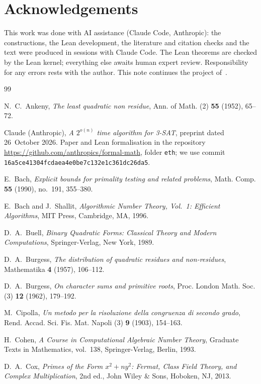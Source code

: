 \documentclass[10pt]{amsart}
\theoremstyle{plain}
\theoremstyle{definition}
\theoremstyle{remark}
\numberwithin{equation}{section}
\begin{document}
\section*{Acknowledgements}
This work was done with AI assistance (Claude Code, Anthropic): the constructions, the Lean development,
the literature and citation checks and the text were produced in sessions with Claude Code. The Lean
theorems are checked by the Lean kernel; everything else awaits human expert review. Responsibility for any
errors rests with the author. This note continues the project of~\cite{Tul26,TulFac26}.

\begin{thebibliography}{99}

N.~C.~Ankeny, \emph{The least quadratic non residue}, Ann. of Math. (2) \textbf{55} (1952), 65--72.

Claude (Anthropic), \emph{A $2^{o(n)}$ time algorithm for {3-SAT}}, preprint dated 26~October 2026.
Paper and Lean formalisation in the repository \url{https://github.com/anthropics/formal-math}, folder
\texttt{eth}; we use commit \texttt{16a5ce41304fcdaea4e0be7c132e1c361dc26da5}.

E.~Bach, \emph{Explicit bounds for primality testing and related problems}, Math. Comp. \textbf{55}
(1990), no.~191, 355--380.

E.~Bach and J.~Shallit, \emph{Algorithmic Number Theory, Vol.~1: Efficient Algorithms}, MIT Press,
Cambridge, MA, 1996.

D.~A.~Buell, \emph{Binary Quadratic Forms: Classical Theory and Modern Computations}, Springer-Verlag,
New York, 1989.

D.~A.~Burgess, \emph{The distribution of quadratic residues and non-residues}, Mathematika \textbf{4}
(1957), 106--112.

D.~A.~Burgess, \emph{On character sums and primitive roots}, Proc. London Math. Soc. (3) \textbf{12}
(1962), 179--192.

M.~Cipolla, \emph{Un metodo per la risoluzione della congruenza di secondo grado}, Rend. Accad. Sci.
Fis. Mat. Napoli (3) \textbf{9} (1903), 154--163.

H.~Cohen, \emph{A Course in Computational Algebraic Number Theory}, Graduate Texts in Mathematics, vol.~138,
Springer-Verlag, Berlin, 1993.

D.~A.~Cox, \emph{Primes of the Form $x^2+ny^2$: Fermat, Class Field Theory, and Complex Multiplication},
2nd ed., John Wiley \& Sons, Hoboken, NJ, 2013.


\end{thebibliography}
\end{document}
